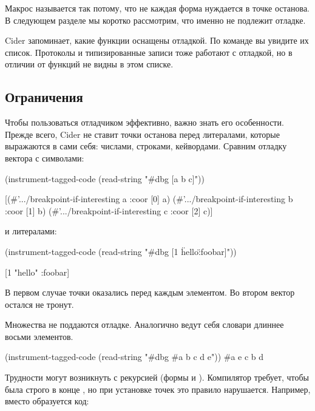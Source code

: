Макрос  называется так потому, что не каждая форма нуждается в точке останова. В следующем разделе мы коротко рассмотрим, что именно не подлежит отладке.

Cider запоминает, какие функции оснащены отладкой. По команде  вы увидите их список. Протоколы и типизированные записи тоже работают с отладкой, но в отличии от функций не видны в этом списке.

\subsection{Ограничения}

Чтобы пользоваться отладчиком эффективно, важно знать его особенности. Прежде всего, Cider не ставит точки останова перед литералами, которые выражаются в сами себя: числами, строками, кейвордами. Сравним отладку вектора с символами:

\begin{english}
  \begin{clojure}
(instrument-tagged-code
 (read-string "#dbg [a b c]"))

[(#'.../breakpoint-if-interesting a {:coor [0]} a)
 (#'.../breakpoint-if-interesting b {:coor [1]} b)
 (#'.../breakpoint-if-interesting c {:coor [2]} c)]
  \end{clojure}
\end{english}

и литералами:

\begin{english}
  \begin{clojure}
(instrument-tagged-code
 (read-string "#dbg [1 \"hello\" :foobar]"))

[1 "hello" :foobar]
  \end{clojure}
\end{english}

В первом случае точки оказались перед каждым элементом. Во втором вектор остался не тронут.

Множества не поддаются отладке. Аналогично ведут себя словари длиннее восьми элементов.

\begin{english}
  \begin{clojure}
(instrument-tagged-code
 (read-string "#dbg #{a b c d e}"))
#{a e c b d}
  \end{clojure}
\end{english}

Трудности могут возникнуть с рекурсией (формы  и ). Компилятор требует, чтобы  была строго в конце , но при установке точек это правило нарушается. Например, вместо  образуется код:

